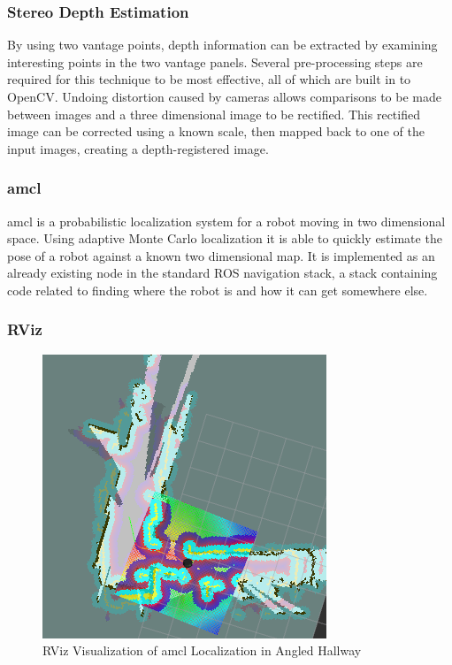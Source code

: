 \documentclass{article}[12]
\begin{document}
		\subsubsection{Stereo Depth Estimation}
		
		By using two vantage points, depth information can be extracted by examining interesting points in the two vantage panels. Several pre-processing steps are required for this technique to be most effective, all of which are built in to OpenCV. Undoing distortion caused by cameras allows comparisons to be made between images and a three dimensional image to be rectified. This rectified image can be corrected using a known scale, then mapped back to one of the input images, creating a depth-registered image.
		
		\subsubsection{amcl}
		
		amcl is a probabilistic localization system for a robot moving in two dimensional space. Using adaptive Monte Carlo localization \cite{doucet_freitas_gordon_2001} it is able to quickly estimate the pose of a robot against a known two dimensional map. It is implemented as an already existing node in the standard ROS navigation stack, a stack containing code related to finding where the robot is and how it can get somewhere else.
		
		\subsubsection{RViz}
		
		\begin{figure}[]
			\centering
			\includegraphics[width=0.5\linewidth]{rviz_screenshot}
			\caption{RViz Visualization of amcl Localization in Angled Hallway}
			\label{fig:rviz}
		\end{figure}
		
\end{document}
